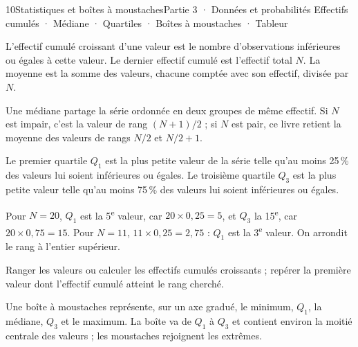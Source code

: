 \begin{ouverture}[courbe]{10}{Statistiques et boîtes à moustaches}{Partie 3 · Données et probabilités}
{Effectifs cumulés · Médiane · Quartiles · Boîtes à moustaches · Tableur}
\end{ouverture}
\pagestyle{otMain}\essentiel\fontsize{11}{15}\selectfont
{}
\begin{definition}L’effectif cumulé croissant d’une valeur est le nombre d’observations inférieures ou égales à cette valeur. Le dernier effectif cumulé est l’effectif total $N$. La moyenne est la somme des valeurs, chacune comptée avec son effectif, divisée par $N$.\end{definition}
\begin{definition}Une médiane partage la série ordonnée en deux groupes de même effectif. Si $N$ est impair, c’est la valeur de rang $(N+1)/2$ ; si $N$ est pair, ce livre retient la moyenne des valeurs de rangs $N/2$ et $N/2+1$.\end{definition}
\begin{definition}Le premier quartile $Q_1$ est la plus petite valeur de la série telle qu’au moins 25\,\% des valeurs lui soient inférieures ou égales. Le troisième quartile $Q_3$ est la plus petite valeur telle qu’au moins 75\,\% des valeurs lui soient inférieures ou égales.\end{definition}
\begin{exemple}Pour $N=20$, $Q_1$ est la 5\textsuperscript{e} valeur, car $20\times0{,}25=5$, et $Q_3$ la 15\textsuperscript{e}, car $20\times0{,}75=15$. Pour $N=11$, $11\times0{,}25=2{,}75$ : $Q_1$ est la 3\textsuperscript{e} valeur. On arrondit le rang à l’entier supérieur.\end{exemple}
\begin{savoirfaire}Ranger les valeurs ou calculer les effectifs cumulés croissants ; repérer la première valeur dont l’effectif cumulé atteint le rang cherché.\end{savoirfaire}
\clearpage
{}
\begin{definition}Une boîte à moustaches représente, sur un axe gradué, le minimum, $Q_1$, la médiane, $Q_3$ et le maximum. La boîte va de $Q_1$ à $Q_3$ et contient environ la moitié centrale des valeurs ; les moustaches rejoignent les extrêmes.\end{definition}
